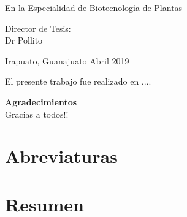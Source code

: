 \documentclass[12pt]{article}
\begin{document}
\bigskip

\begin{center}
    En la Especialidad de Biotecnología de Plantas
\end{center}

\bigskip
\begin{center}
    Director de Tesis: \\
    Dr Pollito
\end{center}

\bigskip
Irapuato, Guanajuato 
\hfill
Abril 2019


\newpage

El presente trabajo fue realizado en ....

\newpage

\textbf{Agradecimientos}\\

Gracias a todos!!

\newpage

\tableofcontents
\newpage

\listoffigures
\newpage

\listoftables
\newpage

\section*{Abreviaturas} 



\newpage
\section*{Resumen}
\end{document}
